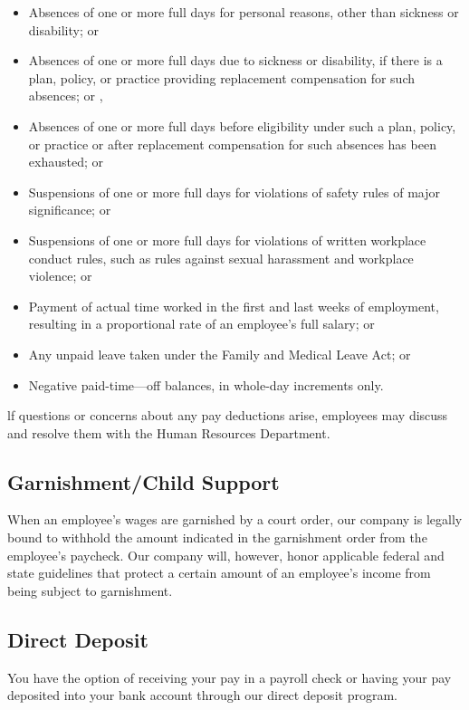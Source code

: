 \begin{itemize} 	
	\item Absences of one or more full days for personal 	reasons, other than sickness or disability; or 	
	\item Absences of one or more full days due to 	sickness or disability, if there is a plan, policy, or 	practice providing replacement compensation for 	such absences; or ,	 
	\item Absences of one or more full days before 	eligibility under such a plan, policy, or practice or 	after replacement compensation for such 	absences has been exhausted; or 	
	\item Suspensions of one or more full days for 	violations of safety rules of major significance; or 	
	\item Suspensions of one or more full days for 	violations of written workplace conduct rules, 	such as rules against sexual harassment and 	workplace violence; or 	
	\item Payment of actual time worked in the first and 	last weeks of employment, resulting in a 	proportional rate of an employee's full salary; or 	
	\item Any unpaid leave taken under the Family and 	Medical Leave Act; or	 	
	\item Negative paid-time—off balances, in whole-day 	increments only. 
\end{itemize}

lf questions or concerns about any pay deductions arise, employees may discuss and resolve them with the Human Resources Department.

\subsection{Garnishment/Child Support}

When an employee's wages are garnished by a court order, our company is legally bound to withhold the amount indicated in the garnishment order from the employee's paycheck. Our company will, however, honor applicable federal and state guidelines that protect a certain amount of an employee's income from being subject to garnishment.

\subsection{Direct Deposit}

You have the option of receiving your pay in a payroll check or having your pay deposited into your bank account through our direct deposit program.

